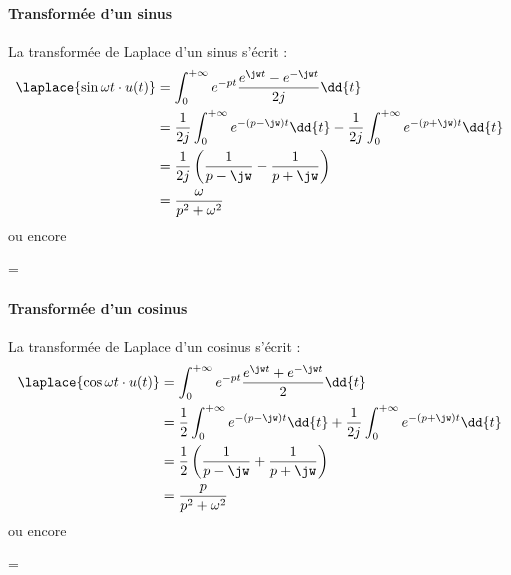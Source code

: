 \paragraph{Transformée d'un sinus}
La transformée de Laplace d'un sinus s'écrit :
\begin{align*}
\laplace{\sin{\omega t}\cdot u(t)}&=
\int_{0}^{+\infty}e^{-pt}\dfrac{e^{\jw t}-e^{-\jw t}}{2j}\dd{t}\\
&=\dfrac{1}{2j}\int_{0}^{+\infty}e^{-(p-\jw)t}\dd{t} - 
  \dfrac{1}{2j}\int_{0}^{+\infty}e^{-(p+\jw)t}\dd{t} \\
&=\dfrac{1}{2j}\left( \dfrac{1}{p-\jw}-\dfrac{1}{p+\jw}\right)\\
&=\dfrac{\omega}{p^2+\omega^2}
\end{align*}
ou encore
\begin{bequation}
    =
\end{bequation}
\paragraph{Transformée d'un cosinus}
La transformée de Laplace d'un cosinus s'écrit :
\begin{align*}
\laplace{\cos{\omega t}\cdot u(t)}&=\int_{0}^{+\infty}e^{-pt}
\dfrac{e^{\jw t}+e^{-\jw t}}{2}\dd{t}\\
&=\dfrac{1}{2}\int_{0}^{+\infty}e^{-(p-\jw)t}\dd{t} + 
\dfrac{1}{2j}\int_{0}^{+\infty}e^{-(p+\jw)t}\dd{t} \\
&=\dfrac{1}{2}\left( \dfrac{1}{p-\jw}+\dfrac{1}{p+\jw}\right)\\
&=\dfrac{p}{p^2+\omega^2}
\end{align*}
ou encore
\begin{bequation}
    =
\end{bequation}
\newpage
{}
\captionsetup{width=0.9\linewidth}
